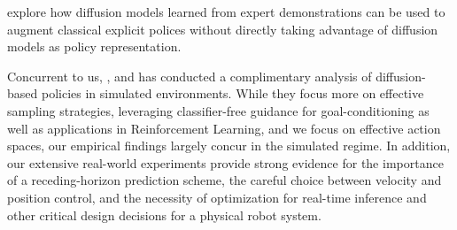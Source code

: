 \citet{wang2023diffusion} explore how diffusion models learned from expert demonstrations can be used to augment classical explicit polices without directly taking advantage of diffusion models as policy representation.

Concurrent to us, \citet{pearce2023imitating}, \citet{reuss2023goal} and \citet{hansen2023idql} has conducted a complimentary analysis of diffusion-based policies in simulated environments. While they focus more on effective sampling strategies, leveraging classifier-free guidance for goal-conditioning as well as applications in Reinforcement Learning, and we focus on effective action spaces, our empirical findings largely concur in the simulated regime.  In addition, our extensive real-world experiments provide strong evidence for the importance of a receding-horizon prediction scheme, the careful choice between velocity and position control, and the necessity of optimization for real-time inference and other critical design decisions for a physical robot system.
